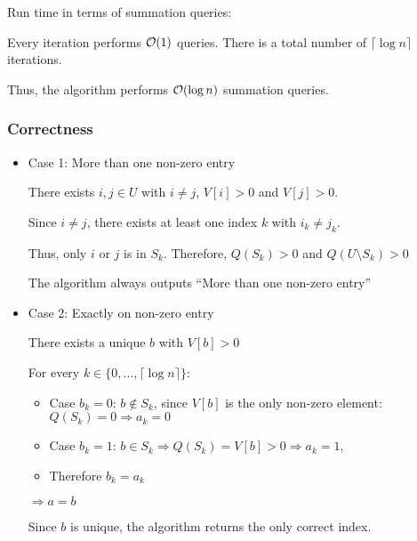 Run time in terms of summation queries:

Every iteration performs $\mathcal{O}(1)$ queries. There is a total number of $\lceil \log n \rceil$ iterations.

Thus, the algorithm performs $\mathcal{O}(\log n)$ summation queries.

\subsubsection*{Correctness}

\begin{itemize}
    \item Case 1: More than one non-zero entry
    
    There exists $i, j \in U$ with $i \neq j$, $V[i] > 0$ and $V[j] > 0$.
    
    Since $i \neq j$, there exists at least one index $k$ with $i_k \neq j_k$.
    
    Thus, only $i$ or $j$ is in $S_k$. Therefore, $Q(S_k) > 0$ and $Q(U \setminus S_k) > 0$
    
    The algorithm always outputs ``More than one non-zero entry''

    
    \item Case 2: Exactly on non-zero entry
    
    There exists a unique $b$ with $V[b] > 0$
    
    For every $k \in \{0,\dots, \lceil \log n \rceil\}$:
    
    \begin{itemize}
        \item Case $b_k = 0$: $b \notin S_k$, since $V[b]$ is the only non-zero element: $Q(S_k) = 0 \Rightarrow a_k = 0$
    
        \item Case $b_k = 1$: $b \in S_k \Rightarrow Q(S_k) = V[b] > 0 \Rightarrow a_k = 1$,
        
        \item Therefore $b_k = a_k$

    \end{itemize}
    
    $\Rightarrow a = b$
    
    Since $b$ is unique, the algorithm returns the only correct index.
    
\end{itemize}

\pagebreak